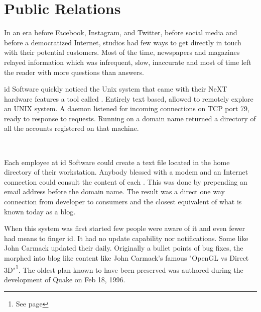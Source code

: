 \section{Public Relations}
In an era before Facebook, Instagram, and Twitter, before social media and before a democratized Internet, studios had few ways to get directly in touch with their potential customers. Most of the time, newspapers and magazines relayed information which was infrequent, slow, inaccurate and most of time left the reader with more questions than answers.


id Software quickly noticed the Unix system that came with their NeXT hardware features a tool called . Entirely text based,  allowed to remotely explore an UNIX system. A  daemon listened for incoming connections on TCP port 79, ready to response to requests. Running  on a domain name returned a directory of all the accounts registered on that machine.\\
\par
{}
\par
{}\\
\par

Each employee at id Software could create a  text file located in the home directory of their \NeXT workstation. Anybody blessed with a modem and an Internet connection could consult the content of each . This was done by prepending an email address before the domain name. The result was a direct one way connection from developer to consumers and the closest equivalent of what is known today as a blog.\\
\par
When this system was first started few people were aware of it and even fewer had means to finger id. It had no update capability nor notifications. Some like John Carmack updated their  daily. Originally a bullet points of bug fixes, the  morphed into blog like content like John Carmack's famous "OpenGL vs Direct 3D"\footnote{See page \pageref{openglvsdirectd}}. The oldest plan known to have been preserved was authored during the development of Quake on Feb 18, 1996.



